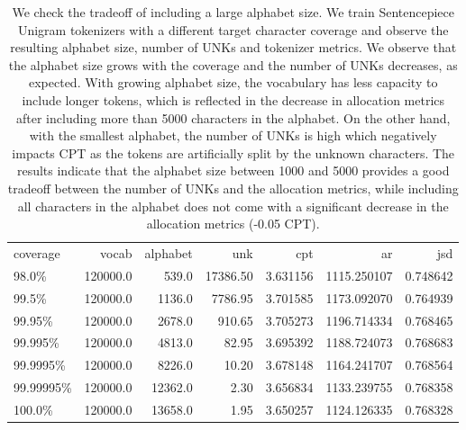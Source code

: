 \begin{table}
\centering
\caption{We check the tradeoff of including a large alphabet size. We train Sentencepiece Unigram tokenizers with a different target character coverage and observe the resulting alphabet size, number of UNKs and tokenizer metrics. We observe that the alphabet size grows with the coverage and the number of UNKs decreases, as expected. With growing alphabet size, the vocabulary has less capacity to include longer tokens, which is reflected in the decrease in allocation metrics after including more than 5000 characters in the alphabet. On the other hand, with the smallest alphabet, the number of UNKs is high which negatively impacts CPT as the tokens are artificially split by the unknown characters. The results indicate that the alphabet size between 1000 and 5000 provides a good tradeoff between the number of UNKs and the allocation metrics, while including all characters in the alphabet does not come with a significant decrease in the allocation metrics (-0.05 CPT).}
\label{tab:coverage_influence}
\begin{tabular}{lrrrrrr}
\toprule
 coverage &    vocab &  alphabet &      unk &      cpt &          ar &      jsd \\
    98.0\% & 120000.0 &     539.0 & 17386.50 & 3.631156 & 1115.250107 & 0.748642 \\
\midrule
    99.5\% & 120000.0 &    1136.0 &  7786.95 & 3.701585 & 1173.092070 & 0.764939 \\
   99.95\% & 120000.0 &    2678.0 &   910.65 & 3.705273 & 1196.714334 & 0.768465 \\
  99.995\% & 120000.0 &    4813.0 &    82.95 & 3.695392 & 1188.724073 & 0.768683 \\
 99.9995\% & 120000.0 &    8226.0 &    10.20 & 3.678148 & 1164.241707 & 0.768564 \\
99.99995\% & 120000.0 &   12362.0 &     2.30 & 3.656834 & 1133.239755 & 0.768358 \\
   100.0\% & 120000.0 &   13658.0 &     1.95 & 3.650257 & 1124.126335 & 0.768328 \\
\bottomrule
\end{tabular}
\end{table}
\